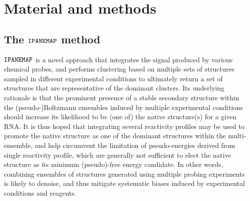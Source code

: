 \documentclass[a4,center,fleqn]{NAR}
\newcommand{\Software}[1]{$\text{\ttfamily #1}$}
\newcommand{\OurTool}{\Software{IPANEMAP}\xspace}
\begin{document}

\section{Material and methods}

\subsection{The \OurTool{} method}

\OurTool{} is a novel approach that integrates the signal produced by various chemical probes, and performs clustering based on multiple sets of structures sampled in different experimental conditions to ultimately return a set of structures that are representative of the dominant clusters. Its underlying rationale is that the prominent presence of a stable secondary structure within the  (pseudo-)Boltzmann ensembles induced by multiple experimental conditions should increase its likelihood to be (one of) the native structure(s) for a given RNA. It is thus hoped that integrating several reactivity profiles may be used to promote the native structure as one of the dominant structures within the multi-ensemble, and help circumvent the limitation of pseudo-energies derived from single reactivity profile, which are generally not sufficient to elect the native structure as its minimum (pseudo)-free energy candidate. In other words, combining ensembles of structures generated using multiple probing experiments is likely to denoise, and thus mitigate systematic biases induced by experimental conditions and reagents.
\end{document}
